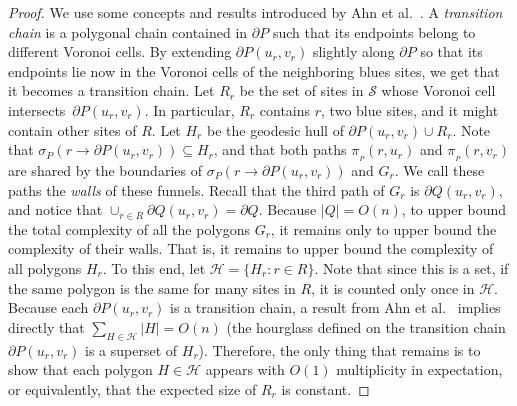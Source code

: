 \documentclass[a4paper,UKenglish]{socg-lipics-v2018}
\newcommand{\s}{\mathcal S}
\newcommand{\p}[3][P]{\ensuremath{\pi_{_{#1}}(#2, #3)}}
\newcommand{\funnel}[2][P]{\ensuremath{\sigma_{\scriptscriptstyle #1}(#2)}}
\begin{document}
\begin{proof}
We use some concepts and results introduced by Ahn et al.~\cite[Section 3]{ahn2015linear}.
A \emph{transition chain} is a polygonal chain contained in $\partial P$ such that its endpoints belong to different Voronoi cells. 
By extending $\partial P(u_r, v_r)$ slightly along $\partial P$ so that its endpoints lie now in the Voronoi cells of the neighboring blues sites, 
we get that it becomes a transition chain. 
Let $R_r$ be the set of sites in $\s$ whose Voronoi cell intersects~$\partial P(u_r, v_r)$. 
In particular, $R_r$ contains $r$, two blue sites, and it might contain other sites of $R$.
Let $H_r$ be the geodesic hull of $\partial P(u_r, v_r) \cup R_r$. 
Note that $\funnel{r\to \partial P(u_r, v_r)} \subseteq H_r$, and that both paths $\p{r}{u_r}$ and $\p{r}{v_r}$ are shared by the boundaries of $\funnel{r\to \partial P(u_r, v_r)}$ and $G_r$.
We call these paths the \emph{walls} of these funnels. 
Recall that the third path of $G_r$ is $\partial Q(u_r, v_r)$, and notice that $\cup_{r\in R} \partial Q(u_r, v_r) = \partial Q$. 
Because $|Q| = O(n)$, to upper bound the total complexity of all the polygons $G_r$, 
it remains only to upper bound the complexity of their walls. 
That is, it remains to upper bound the complexity of all polygons $H_r$. 
To this end, let $\mathcal H = \{H_r : r\in R\}$. Note that since this is a set, if the same polygon is the same for many sites in $R$, it is counted only once in $\mathcal H$.
Because each $\partial P(u_r, v_r)$ is a transition chain, a result from Ahn et al.~\cite[Lemma 3.6]{ahn2015linear} implies directly that $\sum_{H\in \mathcal H} |H| = O(n)$ (the hourglass defined on the transition chain $\partial P(u_r, v_r)$ is a superset of $H_r$). 
Therefore, the only thing that remains is to show that each polygon $H\in \mathcal H$ appears with $O(1)$ multiplicity in expectation, or equivalently, that the expected size of $R_r$ is constant. 



\end{proof}
\end{document}
